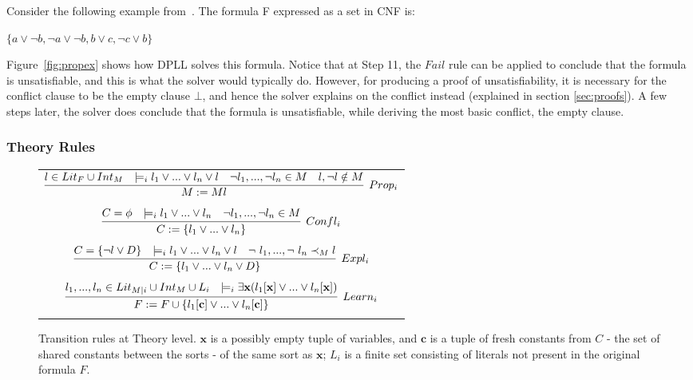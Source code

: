 \documentclass{article}
\begin{document}
Consider the following example from~\cite{DBLP:conf/fmcad/KatzBTRH16}.
The formula F expressed as a set in CNF is:
\begin{center}
$\{a \lor \neg b, \neg a \lor \neg b, b \lor c, \neg c \lor b\}$
\end{center}
Figure~\ref{fig:propex} shows how DPLL solves this 
formula. Notice that at Step 11, the $Fail$ rule can be 
applied to conclude that the formula is unsatisfiable, and 
this is what the solver would typically do. However, for 
producing a proof of unsatisfiability, it is necessary for the 
conflict clause to be the empty clause $\bot$, and hence the 
solver explains on the conflict instead (explained in 
section \ref{sec:proofs}). A few steps later, 
the solver does conclude that the formula is unsatisfiable, 
while deriving the most basic conflict, the empty clause.


\subsubsection{Theory Rules}
\label{sec:theoryrules}

\begin{figure}[t]
	\centering
	\begin{framed}
		\begin{tabular}{c}
			
			$\infer[Prop_i]{M := Ml}	{l \in Lit_F \cup Int_M & 
				\models_i l_1 \lor ... \lor 
				l_n \lor l & \neg l_1, ..., \neg l_n \in M & l,\neg l \notin M}$ \\ \\
			$\infer[Confl_i]{C := \{l_1 \lor ... \lor l_n \}}
			{C = \phi & \models_i l_1 \lor ... \lor l_n & 
				\neg l_1, ..., \neg l_n \in M}$ \\ \\
			$\infer[Expl_i]{C := \{l_1 \lor ... \lor l_n \lor D\}}
			{C = \{\neg l \lor D\} & \models_i l_1 \lor ... \lor l_n \lor l & 
				\neg\ l_1, ..., \neg\ l_n \prec_M l}$ \\ \\
			$\infer[Learn_i]{F := F \cup \{l_1[\textbf{c}] 
				\lor ... \lor l_n[\textbf{c}]\}}
			{l_1,...,l_n \in Lit_{M|i} \cup Int_M \cup L_i & 
				\models_i \exists \textbf{x}(l_1[\textbf{x}] \lor ... 
				\lor l_n[\textbf{x}])}$ \\ \\
		\end{tabular}
	\end{framed}
	\caption{Transition rules at Theory level. $\textbf{x}$ is a possibly empty 
		tuple of variables, and $\textbf{c}$ is a tuple of fresh constants 
		from $C$ - the set of shared constants between the sorts - of the
		same sort as $\textbf{x}$; $L_i$ is a finite set consisting of literals
		not present in the original formula $F$.}
	\label{fig:theoryrules}
\end{figure}
\end{document}
